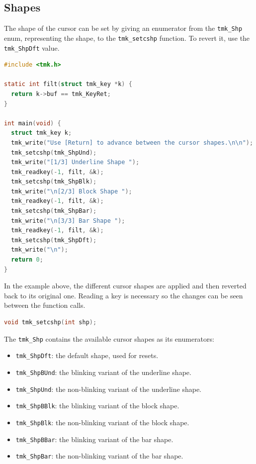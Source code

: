 \documentclass{report}
\begin{document}
\subsection{Shapes}
The shape of the cursor can be set by giving an enumerator from the \texttt{tmk\_Shp} enum, representing the shape, to the \texttt{tmk\_setcshp} function. To revert it, use the \texttt{tmk\_ShpDft} value.
\begin{lstlisting}[language=c,caption=an example that sets cursor shapes.]
#include <tmk.h>

static int filt(struct tmk_key *k) {
  return k->buf == tmk_KeyRet;
}

int main(void) {
  struct tmk_key k;
  tmk_write("Use [Return] to advance between the cursor shapes.\n\n");
  tmk_setcshp(tmk_ShpUnd);
  tmk_write("[1/3] Underline Shape ");
  tmk_readkey(-1, filt, &k);
  tmk_setcshp(tmk_ShpBlk);
  tmk_write("\n[2/3] Block Shape ");
  tmk_readkey(-1, filt, &k);
  tmk_setcshp(tmk_ShpBar);
  tmk_write("\n[3/3] Bar Shape ");
  tmk_readkey(-1, filt, &k);
  tmk_setcshp(tmk_ShpDft);
  tmk_write("\n");
  return 0;
}
\end{lstlisting}
In the example above, the different cursor shapes are applied and then reverted back to its original one. Reading a key is necessary so the changes can be seen between the function calls.
\begin{lstlisting}[language=c,caption=the declaration of the \texttt{tmk\_setcshp} function.]
void tmk_setcshp(int shp);
\end{lstlisting}

The \texttt{tmk\_Shp} contains the available cursor shapes as its enumerators:

\begin{itemize}
  \item \texttt{tmk\_ShpDft}: the default shape, used for resets.
  \item \texttt{tmk\_ShpBUnd}: the blinking variant of the underline shape.
  \item \texttt{tmk\_ShpUnd}: the non-blinking variant of the underline shape.
  \item \texttt{tmk\_ShpBBlk}: the blinking variant of the block shape.
  \item \texttt{tmk\_ShpBlk}: the non-blinking variant of the block shape.
  \item \texttt{tmk\_ShpBBar}: the blinking variant of the bar shape.
  \item \texttt{tmk\_ShpBar}: the non-blinking variant of the bar shape.
\end{itemize}
\end{document}
